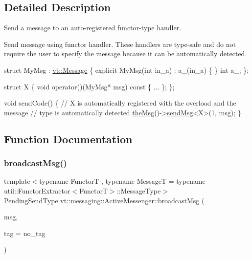\subsection{Detailed Description}
Send a message to an auto-\/registered functor-\/type handler. 

Send message using functor handler. These handlers are type-\/safe and do not require the user to specify the message because it can be automatically detected.


\begin{DoxyCode}
\textcolor{keyword}{struct }MyMsg : \hyperlink{structvt_1_1messaging_1_1_active_msg}{vt::Message} \{
  \textcolor{keyword}{explicit} MyMsg(\textcolor{keywordtype}{int} in\_a) : a\_(in\_a) \{ \}
  \textcolor{keywordtype}{int} a\_;
\};

\textcolor{keyword}{struct }X \{
  \textcolor{keywordtype}{void} operator()(MyMsg* msg)\textcolor{keyword}{ const }\{ ... \};
\};

\textcolor{keywordtype}{void} sendCode() \{
  \textcolor{comment}{// X is automatically registered with the overload and the message}
  \textcolor{comment}{// type is automatically detected}
  \hyperlink{namespacevt_aeafd31f866aeb4dc6fc2f6ee97136350}{theMsg}()->\hyperlink{group__preregister_ga55c6ea91181ae20c681e73a356750916}{sendMsg}<X>(1, msg);
\}
\end{DoxyCode}
 

\subsection{Function Documentation}
\mbox{\label{group__functorsend_gaa5b764aaa06e9c9141b04f6d8a420d43}} 
\subsubsection{\texorpdfstring{broadcast\+Msg()}{broadcastMsg()}}
{\footnotesize\ttfamily template$<$typename FunctorT , typename MessageT  = typename util\+::\+Functor\+Extractor$<$\+Functor\+T$>$\+::\+Message\+Type$>$ \\
\hyperlink{structvt_1_1messaging_1_1_active_messenger_a3626a6ca76d8ad4ec7c3b47a2c70d3a8}{Pending\+Send\+Type} vt\+::messaging\+::\+Active\+Messenger\+::broadcast\+Msg (\begin{DoxyParamCaption}\item[{MessageT $\ast$const}]{msg,  }\item[{\hyperlink{namespacevt_a84ab281dae04a52a4b243d6bf62d0e52}{Tag\+Type} const \&}]{tag = {\ttfamily no\+\_\+tag} }\end{DoxyParamCaption})}



